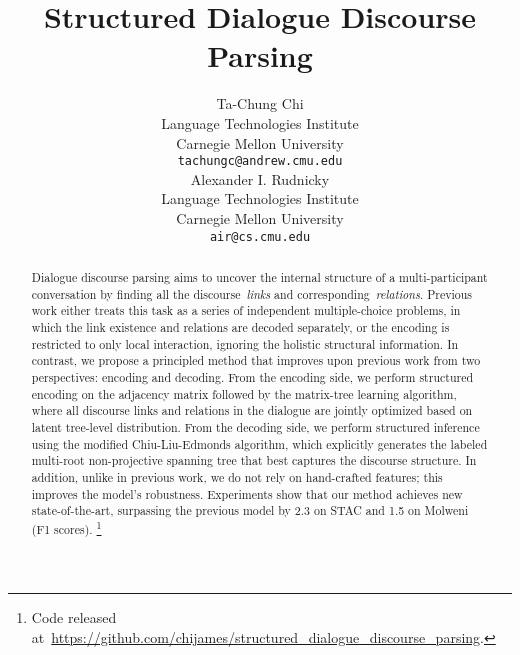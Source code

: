 \documentclass[11pt]{article}
\title{Structured Dialogue Discourse Parsing}
\author{Ta-Chung Chi \\
    Language Technologies Institute \\
  Carnegie Mellon University \\
  \texttt{tachungc@andrew.cmu.edu} \\\And
  Alexander I. Rudnicky \\
  Language Technologies Institute \\
  Carnegie Mellon University \\
  \texttt{air@cs.cmu.edu} \\}
\begin{document}
\maketitle
\begin{abstract}
Dialogue discourse parsing aims to uncover the internal structure of a multi-participant conversation by finding all the discourse~\emph{links} and corresponding~\emph{relations}.
Previous work either treats this task as a series of independent multiple-choice problems, in which the link existence and relations are decoded separately, or the encoding is restricted to only local interaction, ignoring the holistic structural information. In contrast, we propose a principled method that improves upon previous work from two perspectives: encoding and decoding. From the encoding side, we perform structured encoding on the adjacency matrix followed by the matrix-tree learning algorithm, where all discourse links and relations in the dialogue are jointly optimized based on latent tree-level distribution. From the decoding side, we perform structured inference using the modified Chiu-Liu-Edmonds algorithm, which explicitly generates the labeled multi-root non-projective spanning tree that best captures the discourse structure. In addition, unlike in previous work, we do not rely on hand-crafted features; this improves the model's robustness. Experiments show that our method achieves new state-of-the-art, surpassing the previous model by 2.3 on STAC and 1.5 on Molweni (F1 scores). \footnote{Code released at~\url{https://github.com/chijames/structured_dialogue_discourse_parsing}.}
\end{abstract}
\end{document}
